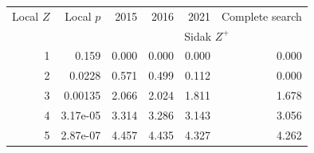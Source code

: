 \begin{tabular}{rrrrrr}\toprule
Local $Z$ & Local $p$ & 2015 & 2016 & 2021 & Complete search\\
 & & \multicolumn{4}{c}{Sidak $Z^+$}\\\midrule
1 & 0.159 & 0.000 & 0.000 & 0.000 & 0.000\\
2 & 0.0228 & 0.571 & 0.499 & 0.112 & 0.000\\
3 & 0.00135 & 2.066 & 2.024 & 1.811 & 1.678\\
4 & 3.17e-05 & 3.314 & 3.286 & 3.143 & 3.056\\
5 & 2.87e-07 & 4.457 & 4.435 & 4.327 & 4.262\\
\bottomrule\end{tabular}
